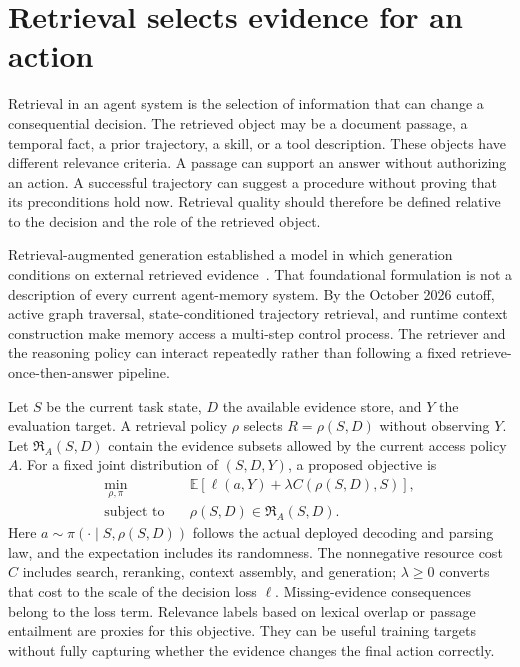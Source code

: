 \section{Retrieval selects evidence for an action}\label{sec:C16:objective}
Retrieval in an agent system is the selection of information that can change a consequential decision. The retrieved object may be a document passage, a temporal fact, a prior trajectory, a skill, or a tool description. These objects have different relevance criteria. A passage can support an answer without authorizing an action. A successful trajectory can suggest a procedure without proving that its preconditions hold now. Retrieval quality should therefore be defined relative to the decision and the role of the retrieved object.

Retrieval-augmented generation established a model in which generation conditions on external retrieved evidence~\cite{lewis2020rag}. That foundational formulation is not a description of every current agent-memory system. By the October 2026 cutoff, active graph traversal, state-conditioned trajectory retrieval, and runtime context construction make memory access a multi-step control process. The retriever and the reasoning policy can interact repeatedly rather than following a fixed retrieve-once-then-answer pipeline.

Let $S$ be the current task state, $D$ the available evidence store, and $Y$ the evaluation target. A retrieval policy $\rho$ selects $R=\rho(S,D)$ without observing $Y$. Let $\mathfrak R_A(S,D)$ contain the evidence subsets allowed by the current access policy $A$. For a fixed joint distribution of $(S,D,Y)$, a proposed objective is
\begin{equation}
 \begin{aligned}
 \min_{\rho,\pi}\quad &\mathbb E\!\left[
 \ell(a,Y)+\lambda C(\rho(S,D),S)\right],\\
 \text{subject to}\quad &\rho(S,D)\in\mathfrak R_A(S,D).
 \end{aligned}
\end{equation}
Here $a\sim\pi(\cdot\mid S,\rho(S,D))$ follows the actual deployed decoding and parsing law, and the expectation includes its randomness. The nonnegative resource cost $C$ includes search, reranking, context assembly, and generation; $\lambda\geq0$ converts that cost to the scale of the decision loss $\ell$. Missing-evidence consequences belong to the loss term. Relevance labels based on lexical overlap or passage entailment are proxies for this objective. They can be useful training targets without fully capturing whether the evidence changes the final action correctly.

